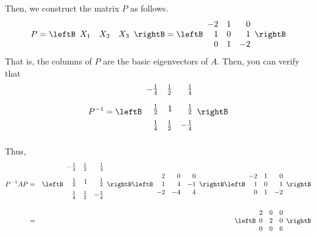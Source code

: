 \begin{solution}
Then, we construct the matrix $P$ as follows. 
\begin{equation*}
P=
\leftB
\begin{array}{rrr}
X_1 & X_2 & X_3
\end{array}
\rightB
=
\leftB
\begin{array}{rrr}
-2 & 1 & 0 \\
1 & 0 & 1 \\
0 & 1 & -2
\end{array}
\rightB
\end{equation*}
That is, the columns of $P$ are the basic  eigenvectors of $A$. Then, you can verify that
\begin{equation*}
P^{-1}=\leftB
\begin{array}{rrr}
-\vspace{0.05in}\frac{1}{4} & \vspace{0.05in}\frac{1}{2} & \vspace{0.05in}\frac{1}{4} \\
\vspace{0.05in}\frac{1}{2} & 1 & \vspace{0.05in}\frac{1}{2} \\
\vspace{0.05in}\frac{1}{4} & \vspace{0.05in}\frac{1}{2} & -\vspace{0.05in}\frac{1}{4}
\end{array}
\rightB 
\end{equation*}
Thus, 
\begin{eqnarray*}
P^{-1}AP &=&\leftB
\begin{array}{rrr}
-\vspace{0.05in}\frac{1}{4} & \vspace{0.05in}\frac{1}{2} & \vspace{0.05in}\frac{1}{4} \\
\vspace{0.05in}\frac{1}{2} & 1 & \vspace{0.05in}\frac{1}{2} \\
\vspace{0.05in}\frac{1}{4} & \vspace{0.05in}\frac{1}{2} & -\vspace{0.05in}\frac{1}{4}
\end{array}
\rightB \leftB
\begin{array}{rrr}
2 & 0 & 0 \\
1 & 4 & -1 \\
-2 & -4 & 4
\end{array}
\rightB \leftB
\begin{array}{rrr}
-2 & 1 & 0 \\
1 & 0 & 1 \\
0 & 1 & -2
\end{array}
\rightB \\
&=&\leftB
\begin{array}{rrr}
2 & 0 & 0 \\
0 & 2 & 0 \\
0 & 0 & 6
\end{array}
\rightB 
\end{eqnarray*}


\end{solution}
